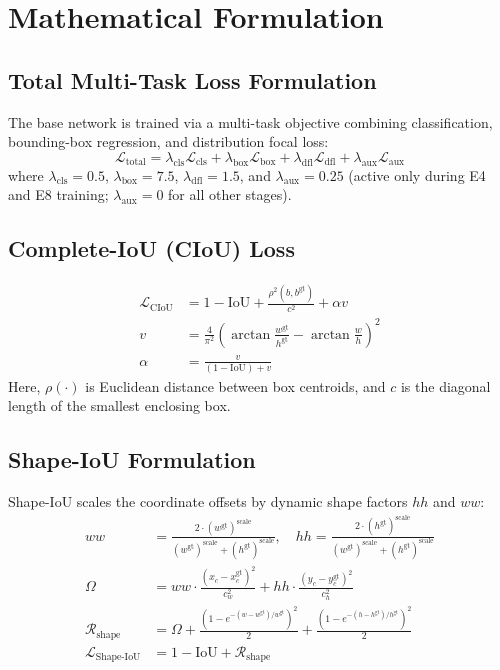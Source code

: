 \documentclass[conference]{IEEEtran}
\begin{document}
\section{Mathematical Formulation}

\subsection{Total Multi-Task Loss Formulation}
The base network is trained via a multi-task objective combining classification, bounding-box regression, and distribution focal loss:
\begin{equation}
\mathcal{L}_{\text{total}} = \lambda_{\text{cls}} \mathcal{L}_{\text{cls}} + \lambda_{\text{box}} \mathcal{L}_{\text{box}} + \lambda_{\text{dfl}} \mathcal{L}_{\text{dfl}} + \lambda_{\text{aux}} \mathcal{L}_{\text{aux}}
\end{equation}
where $\lambda_{\text{cls}} = 0.5$, $\lambda_{\text{box}} = 7.5$, $\lambda_{\text{dfl}} = 1.5$, and $\lambda_{\text{aux}} = 0.25$ (active only during E4 and E8 training; $\lambda_{\text{aux}} = 0$ for all other stages).

\subsection{Complete-IoU (CIoU) Loss}
\begin{align}
\mathcal{L}_{\text{CIoU}} &= 1 - \text{IoU} + \frac{\rho^2(b, b^{\text{gt}})}{c^2} + \alpha v \\
v &= \frac{4}{\pi^2} \left( \arctan \frac{w^{\text{gt}}}{h^{\text{gt}}} - \arctan \frac{w}{h} \right)^2 \\
\alpha &= \frac{v}{(1 - \text{IoU}) + v}
\end{align}
Here, $\rho(\cdot)$ is Euclidean distance between box centroids, and $c$ is the diagonal length of the smallest enclosing box.

\subsection{Shape-IoU Formulation}
Shape-IoU scales the coordinate offsets by dynamic shape factors $hh$ and $ww$:
\begin{align}
ww &= \frac{2 \cdot (w^{\text{gt}})^{\text{scale}}}{(w^{\text{gt}})^{\text{scale}} + (h^{\text{gt}})^{\text{scale}}}, \quad hh = \frac{2 \cdot (h^{\text{gt}})^{\text{scale}}}{(w^{\text{gt}})^{\text{scale}} + (h^{\text{gt}})^{\text{scale}}} \\
\Omega &= ww \cdot \frac{(x_c - x_c^{\text{gt}})^2}{c_w^2} + hh \cdot \frac{(y_c - y_c^{\text{gt}})^2}{c_h^2} \\
\mathcal{R}_{\text{shape}} &= \Omega + \frac{\left(1 - e^{-(w - w^{\text{gt}})/w^{\text{gt}}}\right)^2}{2} + \frac{\left(1 - e^{-(h - h^{\text{gt}})/h^{\text{gt}}}\right)^2}{2} \\
\mathcal{L}_{\text{Shape-IoU}} &= 1 - \text{IoU} + \mathcal{R}_{\text{shape}}
\end{align}
\end{document}
